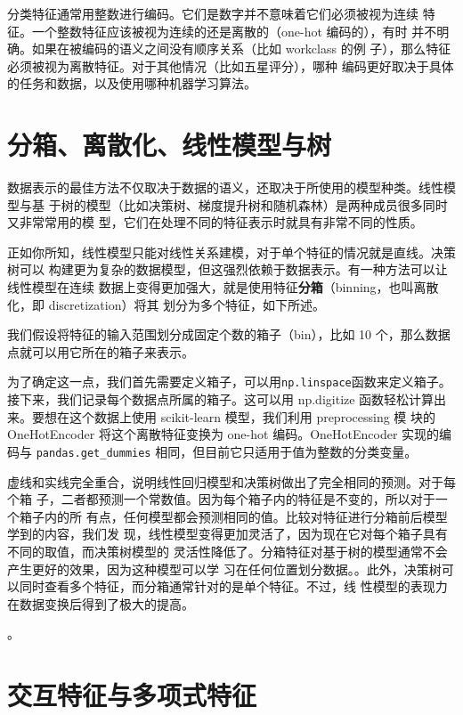 \begin{tcolorbox}
    分类特征通常用整数进行编码。它们是数字并不意味着它们必须被视为连续
    特征。一个整数特征应该被视为连续的还是离散的（one-hot 编码的），有时
    并不明确。如果在被编码的语义之间没有顺序关系（比如 workclass 的例
    子），那么特征必须被视为离散特征。对于其他情况（比如五星评分），哪种
    编码更好取决于具体的任务和数据，以及使用哪种机器学习算法。
\end{tcolorbox}
\section{分箱、离散化、线性模型与树}
数据表示的最佳方法不仅取决于数据的语义，还取决于所使用的模型种类。线性模型与基
于树的模型（比如决策树、梯度提升树和随机森林）是两种成员很多同时又非常常用的模
型，它们在处理不同的特征表示时就具有非常不同的性质。

正如你所知，线性模型只能对线性关系建模，对于单个特征的情况就是直线。决策树可以
构建更为复杂的数据模型，但这强烈依赖于数据表示。有一种方法可以让线性模型在连续
数据上变得更加强大，就是使用特征\textbf{分箱}（binning，也叫离散化，即 discretization）将其
划分为多个特征，如下所述。

我们假设将特征的输入范围划分成固定个数的箱子（bin），比如 10 个，那么数据点就可以用它所在的箱子来表示。

为了确定这一点，我们首先需要定义箱子，可以用\verb|np.linspace|函数来定义箱子。接下来，我们记录每个数据点所属的箱子。这可以用 np.digitize 函数轻松计算出来。要想在这个数据上使用 scikit-learn 模型，我们利用 preprocessing 模
块的 OneHotEncoder 将这个离散特征变换为 one-hot 编码。OneHotEncoder 实现的编码与
\verb|pandas.get_dummies| 相同，但目前它只适用于值为整数的分类变量。

虚线和实线完全重合，说明线性回归模型和决策树做出了完全相同的预测。对于每个箱
子，二者都预测一个常数值。因为每个箱子内的特征是不变的，所以对于一个箱子内的所
有点，任何模型都会预测相同的值。比较对特征进行分箱前后模型学到的内容，我们发
现，线性模型变得更加灵活了，因为现在它对每个箱子具有不同的取值，而决策树模型的
灵活性降低了。分箱特征对基于树的模型通常不会产生更好的效果，因为这种模型可以学
习在任何位置划分数据。。此外，决策树可以同时查看多个特征，而分箱通常针对的是单个特征。不过，线
性模型的表现力在数据变换后得到了极大的提高。

。
\section{交互特征与多项式特征}


